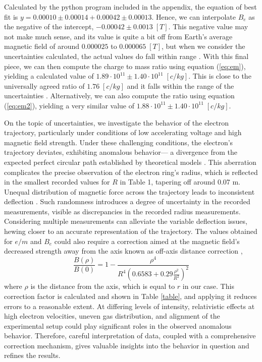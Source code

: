 \documentclass[12pt]{article}
\begin{document}
Calculated by the python program included in the appendix, the equation of best fit is $y=0.00010\pm0.00014+0.00042\pm0.00013$. Hence, we can interpolate $B_e$ as the negative of the intercept, $-0.00042\pm0.0013\;[T]$. This negative value may not make much sense, and its value is quite a bit off from Earth's average magnetic field of around $0.000025$ to $0.000065\;[T]$, but when we consider the uncertainties calculated, the actual values do fall within range \autocite{rockenbauer2001two-dimensional}. With this final piece, we can then compute the charge to mass ratio using equation (\ref{eq:em}), yielding a calculated value of $1.89\cdot10^{11}\pm1.40\cdot10^{11}\;\left[c/kg\right]$. This is close to the universally agreed ratio of $1.76\;\left[c/kg\right]$ and it falls within the range of the uncertainties \autocite{PhysRev.45.781}. Alternatively, we can also compute the ratio using equation (\ref{eq:em2}), yielding a very similar value of $1.88\cdot10^{11}\pm1.40\cdot10^{11}\;\left[c/kg\right]$.

On the topic of uncertainties, we investigate the behavior of the electron trajectory, particularly under conditions of low accelerating voltage and high magnetic field strength. Under these challenging conditions, the electron's trajectory deviates, exhibiting anomalous behavior— a divergence from the expected perfect circular path established by theoretical models \autocite{rockenbauer2001two-dimensional}. This aberration complicates the precise observation of the electron ring's radius, which is reflected in the smallest recorded values for $R$ in Table 1, tapering off around 0.07 m. Unequal distribution of magnetic force across the trajectory leads to inconsistent deflection \autocite{manson2022impact}. Such randomness introduces a degree of uncertainty in the recorded measurements, visible as discrepancies in the recorded radius measurements. Considering multiple measurements can alleviate the variable deflection issues, hewing closer to an accurate representation of the trajectory. The values obtained for $e/m$ and $B_e$ could also require a correction aimed at the magnetic field's decreased strength away from the axis known as off-axis distance correction \autocite{janes1966anomalous},
\begin{equation}
    \frac{B(\rho)}{B(0)}=1-\frac{\rho^4}{R^4\left(0.6583+0.29\frac{\rho^2}{R^2}\right)^2}
\end{equation}
where $\rho$ is the distance from the axis, which is equal to $r$ in our case. This correction factor is calculated and shown in Table \ref{table}, and applying it reduces errors to a reasonable extent. At differing levels of intensity, relativistic effects at high electron velocities, uneven gas distribution, and alignment of the experimental setup could play significant roles in the observed anomalous behavior. Therefore, careful interpretation of data, coupled with a comprehensive correction mechanism, gives valuable insights into the behavior in question and refines the results.
\end{document}
